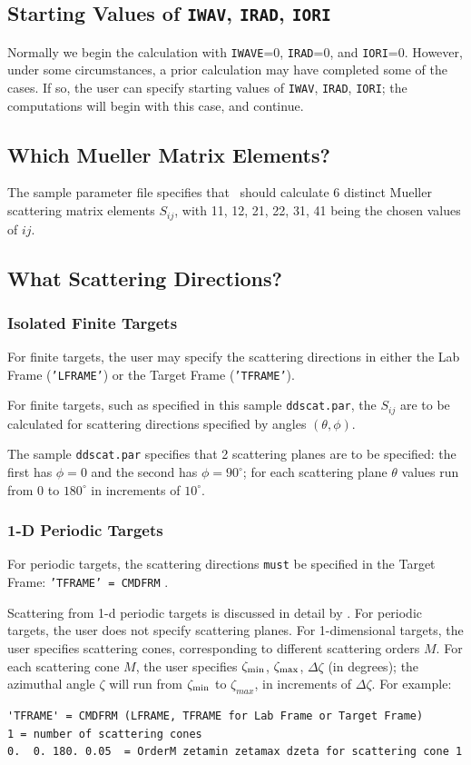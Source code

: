 \subsection{ Starting Values of {\tt IWAV}, {\tt IRAD}, {\tt IORI}}
Normally we begin the calculation with {\tt IWAVE}=0, {\tt IRAD}=0, and
{\tt IORI}=0.  However, under some circumstances, a prior
calculation may have completed some of the cases.  If so, the user
can specify starting values of {\tt IWAV}, {\tt IRAD}, {\tt IORI};
the computations will begin with this case, and continue.

\subsection{ Which Mueller Matrix Elements?}
The sample parameter file specifies that \ddscat\ should calculate 6 distinct
Mueller scattering matrix elements $S_{ij}$, with 
11, 12, 21, 22, 31, 41 being the chosen values of $ij$.

\subsection{ What Scattering Directions?}
\subsubsection{Isolated Finite Targets}
For finite targets, the user may specify the scattering directions in 
either the Lab Frame ({\tt 'LFRAME'})
or the Target Frame ({\tt 'TFRAME'}).

For finite targets, such as specified in this sample {\tt ddscat.par},
the $S_{ij}$ are to be calculated for scattering directions specified
by angles $(\theta,\phi)$.

The sample {\tt ddscat.par} specifies that 2 scattering planes
are to be specified:
the first has $\phi=0$ and the second has $\phi=90^\circ$; for
each scattering plane
$\theta$ values run from 0 to $180^\circ$
in increments of $10^\circ$.

\subsubsection{1-D Periodic Targets}

For periodic targets, the scattering directions {\tt must} be specified in the
Target Frame: {\tt 'TFRAME' = CMDFRM} .

Scattering from 1-d periodic targets is discussed in detail by
\citet{Draine+Flatau_2008a}.
For periodic targets, the user does not specify scattering planes.
For 1-dimensional targets, the user specifies scattering cones, corresponding
to different scattering orders $M$. 
For each scattering cone $M$, the user specifies
$\zeta_{\rm min}$, $\zeta_{\rm max}$, $\Delta\zeta$
(in degrees);
the azimuthal angle $\zeta$ will run from
$\zeta_{\rm min}$ to $\zeta_{max}$, in increments of $\Delta\zeta$.
For example:
{\footnotesize
\begin{verbatim}
'TFRAME' = CMDFRM (LFRAME, TFRAME for Lab Frame or Target Frame)
1 = number of scattering cones
0.  0. 180. 0.05  = OrderM zetamin zetamax dzeta for scattering cone 1
\end{verbatim}
}
